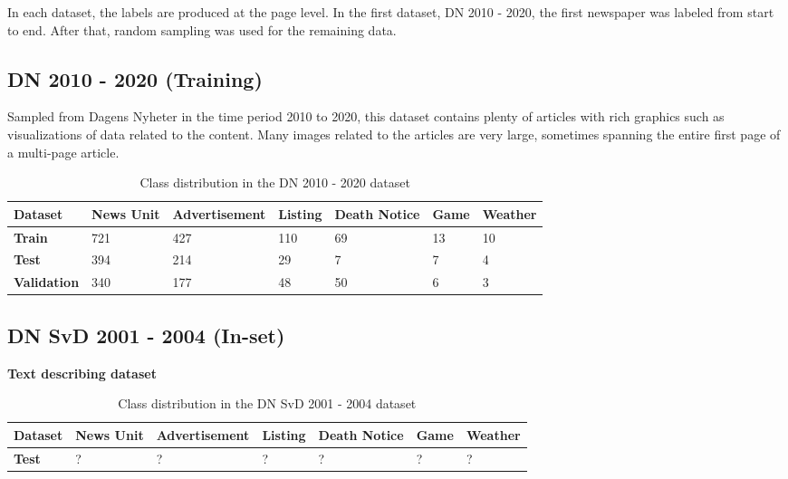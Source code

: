\documentclass[english, bibtex]{kththesis}
\begin{document}
In each dataset, the labels are produced at the page level. In the first dataset, DN 2010 - 2020, the first newspaper was labeled from start to end. After that, random sampling was used for the remaining data. 


\subsection{DN 2010 - 2020 (Training)}

Sampled from Dagens Nyheter in the time period 2010 to 2020, this dataset contains plenty of articles with rich graphics such as visualizations of data related to the content. Many images related to the articles are very large, sometimes spanning the entire first page of a multi-page article. 

\begin{table}[!ht]
  \begin{center}
    \caption{Class distribution in the DN 2010 - 2020 dataset}
    \label{tab:trainclassdist}
    \begin{tabular}{l|l|l|l|l|l|l} %
    \textbf{Dataset} & \textbf{News Unit} & \textbf{Advertisement} & \textbf{Listing} & \textbf{Death Notice} & \textbf{Game} & \textbf{Weather}  \\ 
    \hline
    \textbf{Train} & 721 & 427 & 110 & 69 & 13 & 10 \\    \hline
    \textbf{Test} & 394 & 214 & 29 & 7 & 7 & 4 \\    \hline
    \textbf{Validation} & 340 & 177 & 48 & 50 & 6 & 3 \\    \hline
    \end{tabular}
  \end{center}
\end{table}


\subsection{DN SvD 2001 - 2004 (In-set)}

\textbf{Text describing dataset}

\begin{table}[!ht]
  \begin{center}
    \caption{Class distribution in the  DN SvD 2001 - 2004 dataset}
    \label{tab:insetclassdist}
    \begin{tabular}{l|l|l|l|l|l|l} %
    \textbf{Dataset} & \textbf{News Unit} & \textbf{Advertisement} & \textbf{Listing} & \textbf{Death Notice} & \textbf{Game} & \textbf{Weather}  \\ 
    \hline
    \textbf{Test} & ? & ? & ? & ? & ? & ? \\    \hline
    \end{tabular}
  \end{center}
\end{table}
\end{document}
